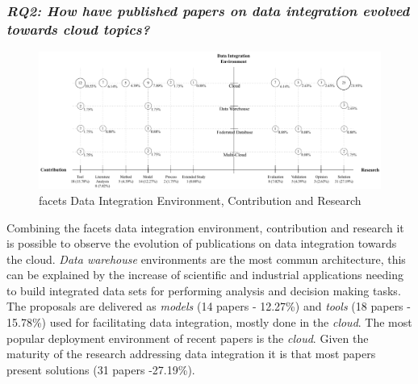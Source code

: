 \subsubsection{\textit{RQ2: How have published papers on data integration evolved towards cloud topics?}}
\begin{figure}[h]
\centering
\includegraphics[scale=0.40]{figs/bubble-charts/DI-Environment-Contribution-Research.pdf}
\caption{facets Data Integration Environment, Contribution and Research}\label{fig:facet2}
\end{figure}

Combining the facets data integration environment, contribution
and research it is possible to observe  the evolution of publications on data integration towards the cloud.  {\em Data warehouse} environments are the most commun architecture, this can be explained by the increase of scientific  and industrial applications needing to build integrated  data sets for performing analysis and decision making tasks. The proposals are delivered as {\em models}  (14  papers - 12.27\%)  and {\em tools} (18
papers - 15.78\%)  used for facilitating data integration, mostly done in the {\em cloud}.  The most popular deployment environment of recent papers is the {\em cloud}. Given the maturity of the research addressing data integration it is that most papers present solutions (31 papers -27.19\%).



